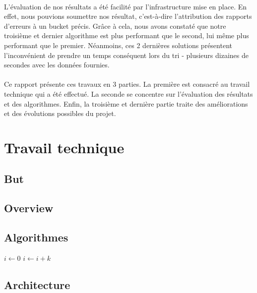 \documentclass[10pt]{article}
\begin{document}
\paragraph{}
L’évaluation de nos résultats a été facilité par l’infrastructure mise en place. En effet, nous pouvions soumettre nos résultat, c’est-à-dire l’attribution des rapports d’erreurs à un bucket précis. Grâce à cela, nous avons constaté que notre troisième et dernier algorithme est plus performant que le second, lui même plus performant que le premier. Néanmoins, ces 2 dernières solutions présentent l’inconvénient de prendre un temps conséquent lors du tri - plusieurs dizaines de secondes avec les données fournies.

\paragraph{}
Ce rapport présente ces travaux en 3 parties. La première est consacré au travail technique qui a été effectué. La seconde se concentre sur l'évaluation des résultats et des algorithmes. Enfin, la troisième et dernière partie traite des améliorations et des évolutions possibles du projet.

\newpage

\section{Travail technique}

\subsection{But}


\subsection{Overview}


\subsection{Algorithmes}

\begin{algorithmic}[]
    \State $i\gets 0$
\Else
        \State $i\gets i+k$
    \EndIf
\EndIf
\end{algorithmic}

\subsection{Architecture}
\end{document}
